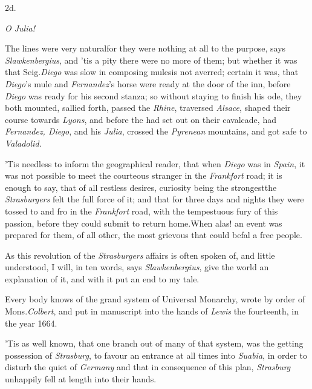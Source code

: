 \documentclass{article}
\begin{document}
\medskip
\centerline{2d.}
\parskip
\bgroup\itshape\small\noindent
\null\qquad O Julia!
\par\egroup
\newpage
The lines were very natural\tsk for they were nothing
at all to the purpose, says \textit{Slawkenbergius}, and ’tis a
pity there were no more of them; but whether it was that
Seig.\@ \textit{Diego} was slow in composing  mules\tsk is not averred; certain it
was, that \textit{Diego}’s mule and \textit{Fernandez}’s
horse were ready at the door of the inn, before \textit{Diego} was
ready for his second stanza; so without staying to finish his ode,
they both mounted, sallied forth, passed the \textit{Rhine}, traversed
\textit{Alsace}, shaped their\break 
course towards \textit{Lyons}, and before the\break
{} had
set out on their cavalcade, had \textit{Fernandez, Diego}, and his
\textit{Julia}, crossed the \textit{Pyrenean} mountains, and got safe
to\break
\textit{Valadolid.}

\newpage
’Tis needless to inform the geographical reader, that when
\textit{Diego} was in \textit{Spain}, it was not possible to meet the
courteous stranger in the \textit{Frankfort} road; it is enough to
say, that of all restless desires, curiosity being the
strongest\tsk the \textit{Strasburgers} felt the full force
of it; and that for three days and nights they were tossed to and
fro in the \textit{Frankfort} road, with the tempestuous fury of this
passion, before they could submit to return home.\tsk When
alas! an event was prepared for them, of all other, the most
grievous that could befal a free people.

As this revolution of the \textit{Strasburgers} affairs is often
spoken of, and little understood, I will, in ten words, says
\textit{Slawkenbergius}, give the world an explanation of it, and with it put an end to my tale.

\newpage
Every body knows of the grand system of Universal Monarchy,
wrote by\break
order of Mons.\@ \textit{Colbert}, and put in ma\-nuscript into
the hands of \textit{Lewis} the fourteenth, in the year 1664.

’Tis as well known, that one branch out of many of that
system, was the\break
getting possession of \textit{Strasburg}, to favour
an entrance at all times into \textit{Suabia}, in\break
order to disturb the quiet of \textit{Germany}\tsh\break
and that in consequence of this plan,\break
\textit{Strasburg} unhappily fell at length into their
hands.
\end{document}

